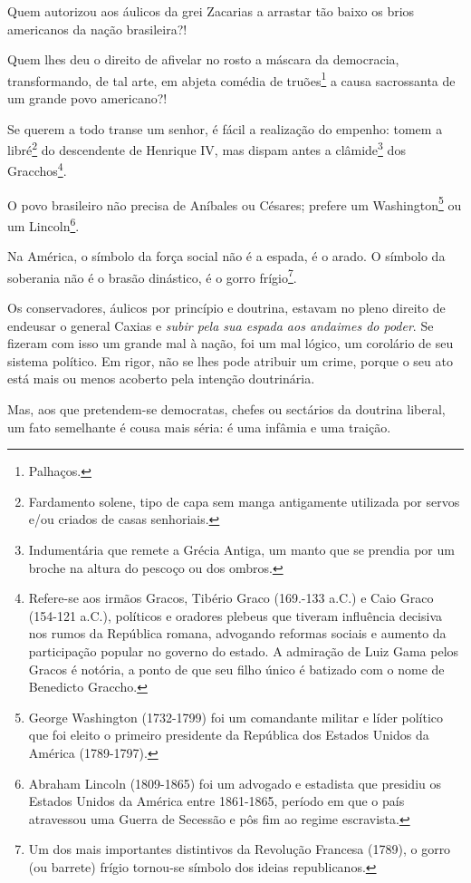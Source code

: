 Quem autorizou aos áulicos da grei Zacarias a arrastar tão baixo os
brios americanos da nação brasileira?!

Quem lhes deu o direito de afivelar no rosto a máscara da democracia,
transformando, de tal arte, em abjeta comédia de truões\footnote{
  Palhaços.} a causa sacrossanta de um grande povo americano?!

Se querem a todo transe um senhor, é fácil a realização do empenho:
tomem a libré\footnote{Fardamento solene, tipo de capa sem manga
  antigamente utilizada por servos e/ou criados de casas senhoriais.} do
descendente de Henrique IV, mas dispam antes a clâmide\footnote{
  Indumentária que remete a Grécia Antiga, um manto que se prendia por
  um broche na altura do pescoço ou dos ombros.} dos
Gracchos\footnote{Refere-se aos irmãos Gracos, Tibério Graco (169.-133
  a.C.) e Caio Graco (154-121 a.C.), políticos e oradores plebeus que
  tiveram influência decisiva nos rumos da República romana, advogando
  reformas sociais e aumento da participação popular no governo do
  estado. A admiração de Luiz Gama pelos Gracos é notória, a ponto de
  que seu filho único é batizado com o nome de Benedicto Graccho.}.

O povo brasileiro não precisa de Aníbales ou Césares; prefere um
Washington\footnote{George Washington (1732-1799) foi um comandante
  militar e líder político que foi eleito o primeiro presidente da
  República dos Estados Unidos da América (1789-1797).} ou um
Lincoln\footnote{Abraham Lincoln (1809-1865) foi um advogado e
  estadista que presidiu os Estados Unidos da América entre 1861-1865,
  período em que o país atravessou uma Guerra de Secessão e pôs fim ao
  regime escravista.}.

Na América, o símbolo da força social não é a espada, é o arado. O
símbolo da soberania não é o brasão dinástico, é o gorro
frígio\footnote{Um dos mais importantes distintivos da Revolução
  Francesa (1789), o gorro (ou barrete) frígio tornou-se símbolo dos
  ideias republicanos.}.

Os conservadores, áulicos por princípio e doutrina, estavam no pleno
direito de endeusar o general Caxias e \emph{subir pela sua espada aos
andaimes do poder}. Se fizeram com isso um grande mal à nação, foi um
mal lógico, um corolário de seu sistema político. Em rigor, não se lhes
pode atribuir um crime, porque o seu ato está mais ou menos acoberto
pela intenção doutrinária.

Mas, aos que pretendem-se democratas, chefes ou sectários da doutrina
liberal, um fato semelhante é cousa mais séria: é uma infâmia e uma
traição.


